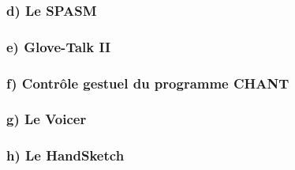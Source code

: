 \subsubsection{d) Le SPASM}
\lipsum[1-1]

\subsubsection{e) Glove-Talk II}
\lipsum[1-1]

\subsubsection{f) Contrôle gestuel du programme CHANT}
\lipsum[1-1]

\subsubsection{g) Le Voicer}
\lipsum[1-1]

\subsubsection{h) Le HandSketch}
\lipsum[1-1]
